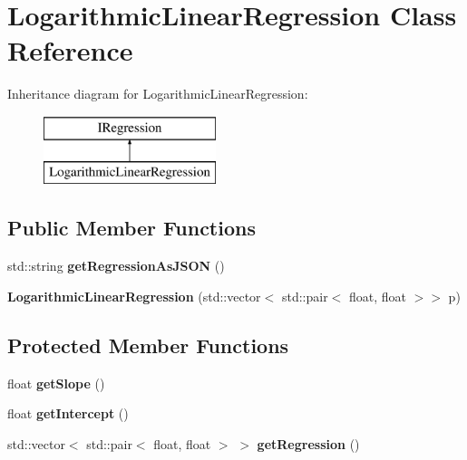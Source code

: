\hypertarget{classLogarithmicLinearRegression}{}\section{Logarithmic\+Linear\+Regression Class Reference}
\label{classLogarithmicLinearRegression}
Inheritance diagram for Logarithmic\+Linear\+Regression\+:\begin{figure}[H]
\begin{center}
\leavevmode
\includegraphics[height=2.000000cm]{classLogarithmicLinearRegression}
\end{center}
\end{figure}
\subsection*{Public Member Functions}
\begin{DoxyCompactItemize}
\item 
\mbox{\label{classLogarithmicLinearRegression_ad1a7402c328c6ed416a5512a3c2de429}} 
std\+::string {\bfseries get\+Regression\+As\+J\+S\+ON} ()
\item 
\mbox{\label{classLogarithmicLinearRegression_a52f142e314972005fec7c29f967d285a}} 
{\bfseries Logarithmic\+Linear\+Regression} (std\+::vector$<$ std\+::pair$<$ float, float $>$$>$ p)
\end{DoxyCompactItemize}
\subsection*{Protected Member Functions}
\begin{DoxyCompactItemize}
\item 
\mbox{\label{classLogarithmicLinearRegression_a83d205c11fbd5e213b6c9d1001347c0d}} 
float {\bfseries get\+Slope} ()
\item 
\mbox{\label{classLogarithmicLinearRegression_a2d200638d2a95e86a445d4f318a2f6c6}} 
float {\bfseries get\+Intercept} ()
\item 
\mbox{\label{classLogarithmicLinearRegression_ad74d3d4fea7588caa8cf0df3b633a842}} 
std\+::vector$<$ std\+::pair$<$ float, float $>$ $>$ {\bfseries get\+Regression} ()
\end{DoxyCompactItemize}
